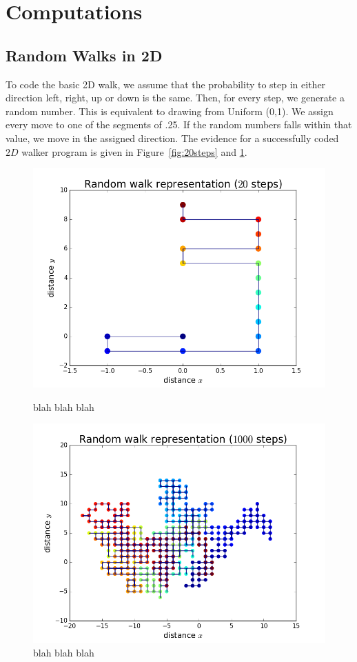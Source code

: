 \documentclass[10pt]{article}
\begin{document}
\section{Computations}
\label{sec:computations}

\subsection{Random Walks in 2D}
\label{sec:computationsRandomWalk}
To code the basic 2D walk, we assume that the probability to step in either direction left, right, up or down is the same. Then, for every step, we generate a random number. This is equivalent to drawing from Uniform (0,1). We assign every move to one of the segments of .25. If the random numbers falls within that value, we move in the assigned direction. The evidence for a successfully coded $2D$ walker program is given in Figure~\ref{fig:20steps} and \ref{fig:1000steps}.

\begin{figure}[!htb]
  \includegraphics[width=\linewidth]{rWalk1.png}
  \caption{blah blah blah}\label{fig:20steps}
\endminipage\hfill
{}
  \includegraphics[width=\linewidth]{rWalk2.png}
  \caption{blah blah blah}\label{fig:1000steps}
\endminipage\hfill
\end{figure}
\end{document}
